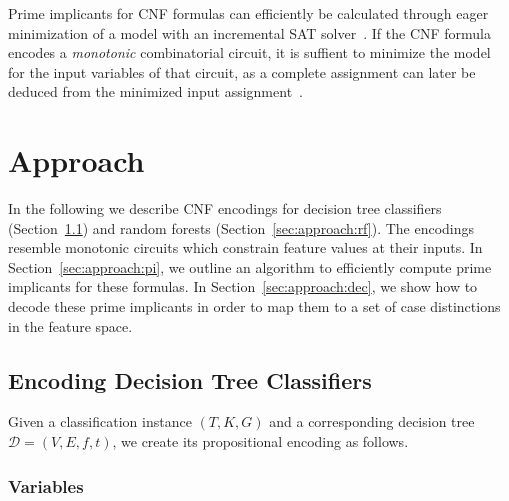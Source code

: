 \documentclass{easychair}
\theoremstyle{definition}
\begin{document}
Prime implicants for CNF formulas can efficiently be calculated through eager minimization of a model with an incremental SAT solver~\cite{Iser:2013:Minimizing,Iser:2020:Disse}. 
If the CNF formula encodes a \emph{monotonic} combinatorial circuit, it is suffient to minimize the model for the input variables of that circuit, as a complete assignment can later be deduced from the minimized input assignment~\cite{Iser:2020:Disse}. 


\section{Approach}
\label{sec:approach}

In the following we describe CNF encodings for decision tree classifiers (Section~\ref{sec:approach:dt}) and random forests (Section~\ref{sec:approach:rf}). 
The encodings resemble monotonic circuits which constrain feature values at their inputs. 
In Section~\ref{sec:approach:pi}, we outline an algorithm to efficiently compute prime implicants for these formulas. 
In Section~\ref{sec:approach:dec}, we show how to decode these prime implicants in order to map them to a set of case distinctions in the feature space. 

\subsection{Encoding Decision Tree Classifiers}
\label{sec:approach:dt}

Given a classification instance $(T, K, G)$ and a corresponding decision tree $\mathcal{D}=(V, E, f, t)$, we create its propositional encoding as follows. 

\subsubsection{Variables} 

\newcommand{\classv}[1]{\alpha(#1)}
\newcommand{\nodehv}[1]{\beta^+(#1)}
\newcommand{\nodelv}[1]{\beta^-(#1)}
\newcommand{\interv}[2]{\gamma(#1,#2)}
\end{document}
